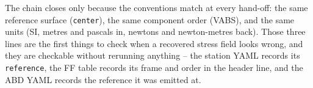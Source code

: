 The chain closes only because the conventions match at every hand-off: the same
reference surface (\texttt{center}), the same component order (VABS), and the
same units (SI, metres and pascals in, newtons and newton-metres back). Those
three lines are the first things to check when a recovered stress field looks
wrong, and they are checkable without rerunning anything -- the station YAML
records its \texttt{reference}, the FF table records its frame and order in the
header line, and the ABD YAML records the reference it was emitted at.
